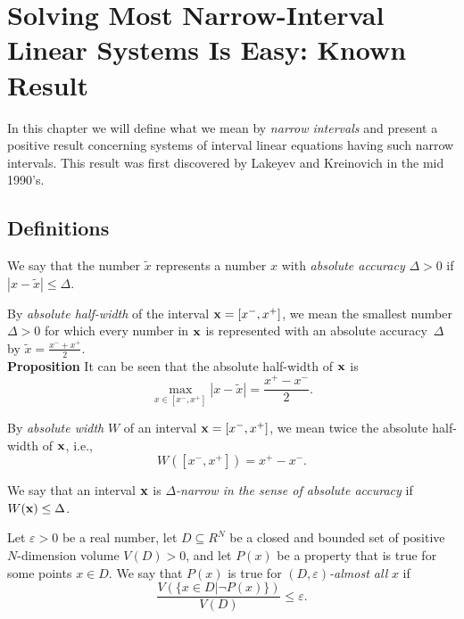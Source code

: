 
\chapter{Solving Most Narrow-Interval Linear Systems Is Easy: Known
Result} \label{MostNarrowEasy}

In this chapter we will define what we mean by {\em narrow intervals\/} and
present a positive result concerning systems of interval linear equations
having such narrow intervals.  This result was first discovered by Lakeyev
and Kreinovich in the mid 1990's.

\section{Definitions}

\begin{definition}
{\rm We say that the number $\tilde x$ represents a number $x$ with
{\em absolute accuracy\/} $\Delta>0$ if $|x-\tilde x|\leq\Delta$.}
\end{definition}

\begin{definition}
{\rm By {\em absolute half-width\/} of the interval ${\bf x}=[x^-,x^+]$, we
mean the smallest number $\Delta>0$ for which every number in ${\bf x}$ is
represented with an absolute accuracy~$\Delta$ by $\tilde x=\displaystyle{
\frac{x^-+x^+}{2}}$.\\[0.5pc]
{\bf Proposition} It can be seen that the absolute half-width of ${\bf x}$ is
$$
  \max_{x\in [x^-,x^+]} |x-\tilde x| = \frac{x^+-x^-}{2}.
$$}
\end{definition}

\begin{definition}
{\rm By {\em absolute width\/} $W$ of an interval ${\bf x}=[x^-,x^+]$, we mean
twice the absolute half-width of ${\bf x}$, i.e.,
$$
  W([x^-,x^+])=x^+-x^-.
$$}
\end{definition}

\begin{definition}
{\rm We say that an interval ${\bf x}$ is {\em $\Delta$-narrow in the sense
of absolute accuracy\/} if $W({\bf x})\leq\Delta$.}
\end{definition}

\begin{definition}
{\rm Let $\varepsilon>0$ be a real number, let $D\subseteq R^N$ be a closed
and bounded set of positive $N$-dimension volume $V(D)>0$, and let
$P(x)$ be a property that is true for some points $x\in D$.  We say that $P(x)$
is true for {\em $(D,\varepsilon)$-almost all\/} $x$ if}
$$
  \frac{V(\{x\in D|\neg P(x)\})}{V(D)}\leq \varepsilon.
$$
\end{definition}

